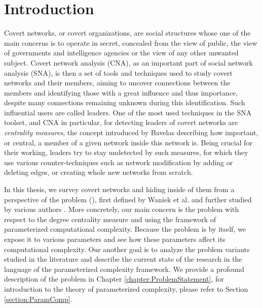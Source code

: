 \chapter*{Introduction}

\setcounter{page}{1}

Covert networks, or covert organizations, are social structures whose one of the main concerns is to operate in secret,
concealed from the view of public, the view of governments and intelligence agencies or the view of any other unwanted subject.
Covert network analysis (CNA), as an important part of social network analysis (SNA),
is then a set of tools and techniques used to study covert networks and their members,
aiming to uncover connections between the members and identifying those with a great
influence and thus importance, despite many connections remaining unknown during this identification.
Such influential users are called leaders.
One of the most used techniques in the SNA toolset, and CNA in particular, for detecting leaders of covert networks
are \emph{centrality measures},
the concept introduced by Bavelas \cite{Bavelas1948} describing how important, or central,
a member of a given network inside this network is.
Being crucial for their working, leaders try to stay undetected by such measures,
for which they use various counter-techniques such as
network modification by adding or deleting edges, or creating whole new networks from scratch.

In this thesis, we survey covert networks and hiding inside of them from a perspective of the \HL problem (\HLshort), first defined by
Waniek et al. \cite{Waniek2017} and further studied by various authors \cite{Dey2019,Waniek2021,Mohan2023}.
More concretely, our main concern is the \HL problem with respect to the degree centrality measure
and using the framework of parameterized computational complexity.
Because the problem is \NPh by itself, we expose it to various parameters and
see how these parameters affect its computational complexity.
Our another goal is to analyze the problem variants studied in the literature
and describe the current state of the research in the language of the parameterized complexity framework.
We provide a profound description of the \HL problem in Chapter \ref{chapter:ProblemStatement}, for introduction to
the theory of parameterized complexity, please refer to Section \ref{section:ParamComp}.
